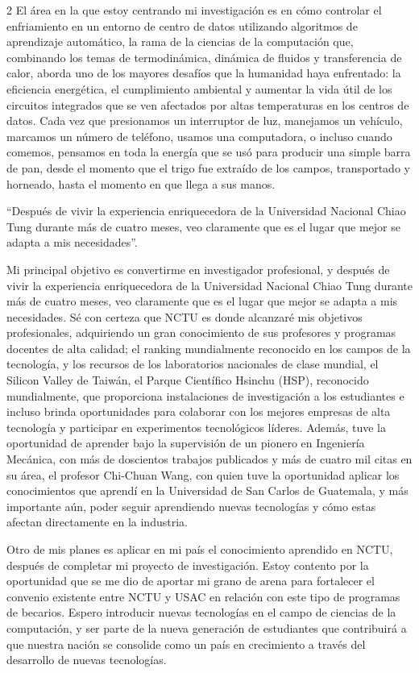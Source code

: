 \documentclass[12pt,spanish,Letterpaper,openany]{book}
\begin{document}
\begin {multicols}{2}
El área en la que estoy centrando mi investigación es en cómo controlar el enfriamiento en un entorno de centro de datos utilizando algoritmos de aprendizaje automático, la rama de la ciencias de la computación que, combinando los temas de termodinámica, dinámica de fluidos y transferencia de calor, aborda uno de los mayores desafíos que la humanidad haya enfrentado: la eficiencia energética, el cumplimiento ambiental y aumentar la vida útil de los circuitos integrados que se ven afectados por altas temperaturas en los centros de datos. Cada vez que presionamos un interruptor de luz, manejamos un vehículo, marcamos un número de teléfono, usamos una computadora, o incluso cuando comemos, pensamos en toda la energía que se usó para producir una simple barra de pan, desde el momento que el trigo fue extraído de los campos, transportado y horneado, hasta el momento en que llega a sus manos.

``Después de vivir la experiencia enriquecedora de la Universidad Nacional Chiao Tung durante más de cuatro meses, veo claramente que es el lugar que mejor se adapta a mis necesidades''.

Mi principal objetivo es convertirme en investigador profesional, y después de vivir la experiencia enriquecedora de la Universidad Nacional Chiao Tung durante más de cuatro meses, veo claramente que es el lugar que mejor se adapta a mis necesidades. Sé con certeza que NCTU es donde alcanzaré mis objetivos profesionales, adquiriendo un gran conocimiento de sus profesores y programas docentes de alta calidad; el ranking mundialmente reconocido en los campos de la tecnología, y los recursos de los laboratorios nacionales de clase mundial, el Silicon Valley de Taiwán, el Parque Científico Hsinchu (HSP), reconocido mundialmente, que proporciona instalaciones de investigación a los estudiantes e incluso brinda oportunidades para colaborar con los mejores empresas de alta tecnología y participar en experimentos tecnológicos líderes. Además, tuve la oportunidad de aprender bajo la supervisión de un pionero en Ingeniería Mecánica, con más de doscientos trabajos publicados y más de cuatro mil citas en su área, el profesor Chi-Chuan Wang, con quien tuve la oportunidad aplicar los conocimientos que aprendí en la Universidad de San Carlos de Guatemala, y más importante aún, poder seguir aprendiendo nuevas tecnologías y cómo estas afectan directamente en la industria.

Otro de mis planes es aplicar en mi país el conocimiento aprendido en NCTU, después de completar mi proyecto de investigación. Estoy contento por la oportunidad que se me dio de aportar mi grano de arena para fortalecer el convenio existente entre NCTU y USAC en relación con este tipo de programas de becarios. Espero introducir nuevas tecnologías en el campo de ciencias de la computación, y ser parte de la nueva generación de estudiantes que contribuirá a que nuestra nación se consolide como un país en crecimiento a través del desarrollo de nuevas tecnologías.


\end{multicols}
\end{document}
